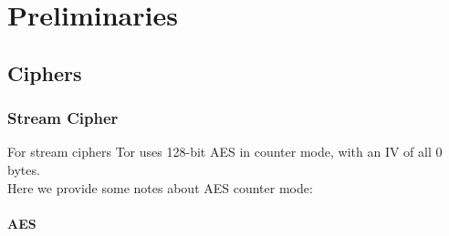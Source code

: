 
\chapter{Preliminaries}

\section{Ciphers}
\subsection{Stream Cipher}
For stream ciphers Tor uses 128-bit AES in counter mode, with an IV of all 0 bytes.
\\
Here we provide some notes about AES counter mode:

\subsubsection{AES}

